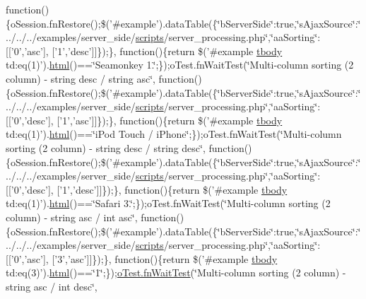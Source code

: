 \begin{DoxyCompactItemize}
function()\{o\+Session.\+fn\+Restore();\$('\#example').data\+Table(\{\char`\"{}b\+Server\+Side\char`\"{}\+:true,\char`\"{}s\+Ajax\+Source\char`\"{}\+:\char`\"{}../../../examples/server\+\_\+side/\hyperlink{tinymce_8jquery_8dev_8js_a09066d4d580eeec222f858d588b4cdef}{scripts}/server\+\_\+processing.\+php\char`\"{},\char`\"{}aa\+Sorting\char`\"{}\+:\mbox{[}\mbox{[}'0','asc'\mbox{]}, \mbox{[}'1','desc'\mbox{]}\mbox{]}\});\}, function()\{return \$('\#example \hyperlink{core_8constructor_8js_a99b0542c7c50fe8757c55bf9dac5f3be}{tbody} td\+:eq(1)').\hyperlink{tinymce_8jquery_8dev_8js_ac2090bcf2ff968c0083d5de53a6544f3}{html}()==\char`\"{}Seamonkey 1.\char`\"{};\});o\+Test.\+fn\+Wait\+Test(\char`\"{}Multi-\/column sorting (2 column) -\/ string desc / string asc\char`\"{}, function()\{o\+Session.\+fn\+Restore();\$('\#example').data\+Table(\{\char`\"{}b\+Server\+Side\char`\"{}\+:true,\char`\"{}s\+Ajax\+Source\char`\"{}\+:\char`\"{}../../../examples/server\+\_\+side/\hyperlink{tinymce_8jquery_8dev_8js_a09066d4d580eeec222f858d588b4cdef}{scripts}/server\+\_\+processing.\+php\char`\"{},\char`\"{}aa\+Sorting\char`\"{}\+:\mbox{[}\mbox{[}'0','desc'\mbox{]}, \mbox{[}'1','asc'\mbox{]}\mbox{]}\});\}, function()\{return \$('\#example \hyperlink{core_8constructor_8js_a99b0542c7c50fe8757c55bf9dac5f3be}{tbody} td\+:eq(1)').\hyperlink{tinymce_8jquery_8dev_8js_ac2090bcf2ff968c0083d5de53a6544f3}{html}()==\char`\"{}i\+Pod Touch / i\+Phone\char`\"{};\});o\+Test.\+fn\+Wait\+Test(\char`\"{}Multi-\/column sorting (2 column) -\/ string desc / string desc\char`\"{}, function()\{o\+Session.\+fn\+Restore();\$('\#example').data\+Table(\{\char`\"{}b\+Server\+Side\char`\"{}\+:true,\char`\"{}s\+Ajax\+Source\char`\"{}\+:\char`\"{}../../../examples/server\+\_\+side/\hyperlink{tinymce_8jquery_8dev_8js_a09066d4d580eeec222f858d588b4cdef}{scripts}/server\+\_\+processing.\+php\char`\"{},\char`\"{}aa\+Sorting\char`\"{}\+:\mbox{[}\mbox{[}'0','desc'\mbox{]}, \mbox{[}'1','desc'\mbox{]}\mbox{]}\});\}, function()\{return \$('\#example \hyperlink{core_8constructor_8js_a99b0542c7c50fe8757c55bf9dac5f3be}{tbody} td\+:eq(1)').\hyperlink{tinymce_8jquery_8dev_8js_ac2090bcf2ff968c0083d5de53a6544f3}{html}()==\char`\"{}Safari 3.\char`\"{};\});o\+Test.\+fn\+Wait\+Test(\char`\"{}Multi-\/column sorting (2 column) -\/ string asc / int asc\char`\"{}, function()\{o\+Session.\+fn\+Restore();\$('\#example').data\+Table(\{\char`\"{}b\+Server\+Side\char`\"{}\+:true,\char`\"{}s\+Ajax\+Source\char`\"{}\+:\char`\"{}../../../examples/server\+\_\+side/\hyperlink{tinymce_8jquery_8dev_8js_a09066d4d580eeec222f858d588b4cdef}{scripts}/server\+\_\+processing.\+php\char`\"{},\char`\"{}aa\+Sorting\char`\"{}\+:\mbox{[}\mbox{[}'0','asc'\mbox{]}, \mbox{[}'3','asc'\mbox{]}\mbox{]}\});\}, function()\{return \$('\#example \hyperlink{core_8constructor_8js_a99b0542c7c50fe8757c55bf9dac5f3be}{tbody} td\+:eq(3)').\hyperlink{tinymce_8jquery_8dev_8js_ac2090bcf2ff968c0083d5de53a6544f3}{html}()==\char`\"{}1\char`\"{};\});\hyperlink{onhold_24__server-side_2__zero__config_8js_ab25c4d596771c0133cdc45178ce72c3d}{o\+Test.\+fn\+Wait\+Test}(\char`\"{}Multi-\/column sorting (2 column) -\/ string asc / int desc\char`\"{}, 
\end{DoxyCompactItemize}
